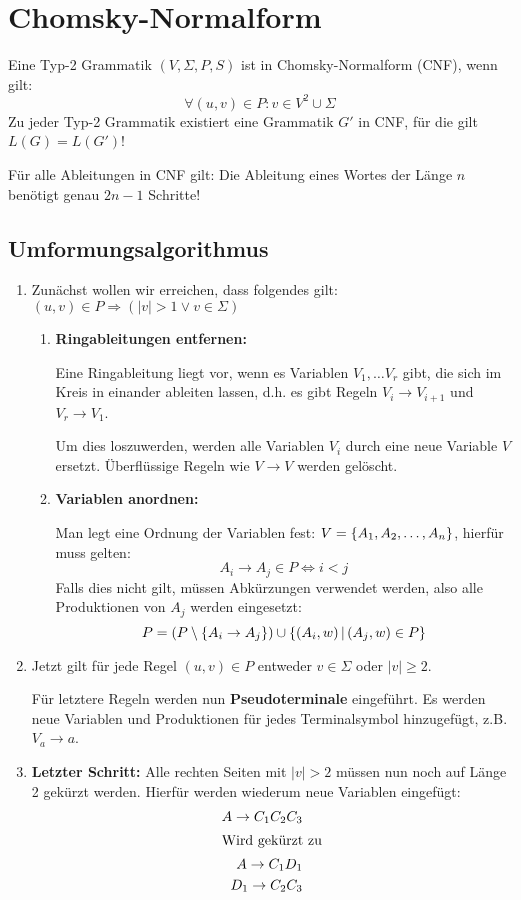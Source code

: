 \section{Chomsky-Normalform}
Eine Typ-2 Grammatik $(V,\Sigma,P,S)$ ist in Chomsky-Normalform (CNF),  wenn gilt:
\begin{equation*}
	\forall (u,v)\in P: v\in V^2\cup \Sigma
\end{equation*}
Zu jeder Typ-2 Grammatik existiert eine Grammatik $G'$ in CNF, für die gilt $L(G)=L(G')$!

Für alle Ableitungen in CNF gilt: Die Ableitung eines Wortes der Länge $n$ benötigt genau $2n-1$ Schritte!
\subsection{Umformungsalgorithmus}\label{cnf:algorithmus}
\begin{enumerate}
	\item Zunächst wollen wir erreichen, dass folgendes gilt: $(u,v)\in P\Rightarrow (|v|>1 \vee v\in \Sigma)$
	\begin{enumerate}
		\item \textbf{Ringableitungen entfernen:}

		Eine Ringableitung liegt vor, wenn es Variablen $V_1,\ldots V_r$ gibt, die sich im Kreis in einander ableiten lassen, d.h. es gibt Regeln $V_i\rightarrow V_{i+1}$ und $V_r\rightarrow V_1$.

		Um dies loszuwerden, werden alle Variablen $V_i$ durch eine neue Variable $V$ ersetzt. Überflüssige Regeln wie $V\rightarrow V$ werden gelöscht.
		\item \textbf{Variablen anordnen:}

		Man legt eine Ordnung der Variablen fest: $V=\left\{ A_1, A_2, \ldots, A_n \right\}$, hierfür muss gelten:
		\begin{equation*}
			A_i\rightarrow A_j \in P \Leftrightarrow i<j
		\end{equation*}
		Falls dies nicht gilt, müssen Abkürzungen verwendet werden, also alle Produktionen von $A_j$ werden eingesetzt:
		\begin{equation*}
			P=(P\setminus\left\{ A_i\rightarrow A_j \right\})\cup\left\{ (A_i,w) \,\middle|\, (A_j,w)\in P \right\}
		\end{equation*}
	\end{enumerate}
	\item Jetzt gilt für jede Regel $(u,v)\in P$ entweder $v\in\Sigma$ oder $|v|\geq 2$.

	Für letztere Regeln werden nun \textbf{Pseudoterminale} eingeführt. Es werden neue Variablen und Produktionen für jedes Terminalsymbol hinzugefügt, z.B. $V_a\rightarrow a$.

	\item \textbf{Letzter Schritt:} Alle rechten Seiten mit $|v|>2$ müssen nun noch auf Länge 2 gekürzt werden. Hierfür werden wiederum neue Variablen eingefügt:%
	\begin{align*}
		A\rightarrow C_1C_2C_3\\
		\intertext{Wird gekürzt zu}
		A\rightarrow C_1D_1\\
		D_1\rightarrow C_2C_3
	\end{align*}
\end{enumerate}

